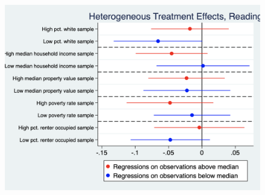\documentclass[12pt]{article}
\begin{document}
\begin{landscape}

\begin{figure}
    \centering
    \includegraphics[scale=0.5]{output/graphs/read_heterogeneous_effects.png}
    \caption{}
    \label{fig:my_label}
\end{figure}
\end{landscape}
\end{document}

